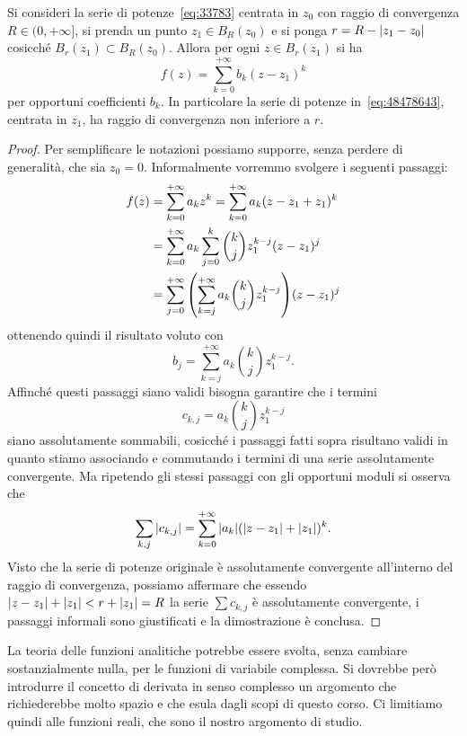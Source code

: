 \begin{theorem}
\label{th:488456367}
Si consideri la serie di potenze~\eqref{eq:33783} centrata in $z_0$
con raggio di convergenza
$R\in (0,+\infty]$, si prenda un punto $z_1 \in B_R(z_0)$
e si ponga $r=R-{\left|z_1-z_0\right|}$ cosicché $B_r(z_1)\subset B_R(z_0)$.
Allora
per ogni $z\in B_r(z_1)$ si ha
\begin{equation}\label{eq:48478643}
  f(z) = \sum_{k=0}^{+\infty} b_k (z - z_1)^k
\end{equation}
per opportuni coefficienti $b_k$. In particolare la serie
di potenze in~\eqref{eq:48478643}, centrata in $z_1$,
ha raggio di convergenza non inferiore a $r$.
\end{theorem}
%
\begin{proof}
Per semplificare le notazioni possiamo supporre, senza perdere di generalità,
che sia $z_0=0$.
Informalmente vorremmo svolgere i seguenti passaggi:
\begin{align*}
  f(z)
  &= \sum_{k=0}^{+\infty} a_k z^k
  = \sum_{k=0}^{+\infty} a_k (z-z_1+z_1)^k \\
  &= \sum_{k=0}^{+\infty} a_k \sum_{j=0}^k {k \choose j} z_1^{k-j}(z-z_1)^j\\
  &= \sum_{j=0}^{+\infty} {\left( \sum_{k=j}^{+\infty} a_k{k \choose j} z_1^{k-j} \right)} (z-z_1)^j
\end{align*}
ottenendo quindi il risultato voluto con
\[
  b_j = \sum_{k=j}^{+\infty} a_k{k \choose j} z_1^{k-j}.
\]
Affinché questi passaggi siano validi bisogna garantire che i termini
\[
  c_{k,j} = a_k {k \choose j} z_1^{k-j}
\]
siano assolutamente sommabili, cosicché i passaggi fatti sopra risultano
validi in quanto stiamo associando e commutando i termini di una serie
assolutamente convergente. Ma ripetendo gli stessi passaggi con gli
opportuni moduli si osserva che
\[
  \sum_{k,j} {\left|c_{k,j}\right|} = \sum_{k=0}^{+\infty} {\left|a_k\right|}({\left|z-z_1\right|}+{\left|z_1\right|})^k.
\]
Visto che la serie di potenze originale è assolutamente convergente
all'interno del raggio di convergenza, possiamo affermare che essendo
${\left|z-z_1\right|}+{\left|z_1\right|} < r + {\left|z_1\right|} = R$
la serie $\sum c_{k,j}$ è assolutamente convergente,
i passaggi informali sono giustificati e la dimostrazione è conclusa.
\end{proof}

La teoria delle funzioni analitiche potrebbe essere svolta, senza cambiare
sostanzialmente nulla, per le funzioni di variabile complessa.
Si dovrebbe però introdurre il concetto di derivata in senso complesso
un argomento che richiederebbe molto spazio e che esula dagli scopi di questo corso.
Ci limitiamo quindi alle funzioni reali, che sono il nostro argomento di studio.

